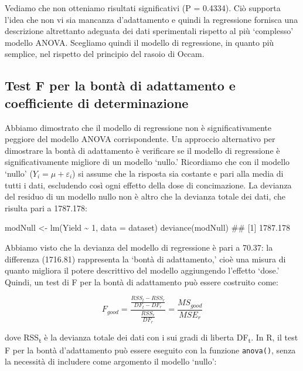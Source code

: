 \documentclass[a4paper,12pt,oneside]{book}
\newenvironment{Shaded}{\begin{snugshade}}{\end{snugshade}}
\newcommand{\DecValTok}[1]{#1}
\newcommand{\SpecialCharTok}[1]{#1}
\newcommand{\DocumentationTok}[1]{#1}
\newcommand{\OtherTok}[1]{#1}
\newcommand{\FunctionTok}[1]{#1}
\newcommand{\AttributeTok}[1]{#1}
\newcommand{\NormalTok}[1]{#1}
\begin{document}
Vediamo che non otteniamo risultati significativi (P = 0.4334). Ciò supporta l'idea che non vi sia mancanza d'adattamento e quindi la regressione fornisca una descrizione altrettanto adeguata dei dati sperimentali rispetto al più `complesso' modello ANOVA. Scegliamo quindi il modello di regressione, in quanto più semplice, nel rispetto del principio del rasoio di Occam.

\hypertarget{test-f-per-la-bontuxe0-di-adattamento-e-coefficiente-di-determinazione}{%
\subsection{Test F per la bontà di adattamento e coefficiente di determinazione}\label{test-f-per-la-bontuxe0-di-adattamento-e-coefficiente-di-determinazione}}

Abbiamo dimostrato che il modello di regressione non è significativamente peggiore del modello ANOVA corrispondente. Un approccio alternativo per dimostrare la bontà di adattamento è verificare se il modello di regressione è significativamente migliore di un modello `nullo.' Ricordiamo che con il modello `nullo' (\(Y_i = \mu + \varepsilon_i\)) si assume che la risposta sia costante e pari alla media di tutti i dati, escludendo così ogni effetto della dose di concimazione. La devianza del residuo di un modello nullo non è altro che la devianza totale dei dati, che risulta pari a 1787.178:

\begin{Shaded}
\begin{Highlighting}[]
\NormalTok{modNull }\OtherTok{\textless{}{-}} \FunctionTok{lm}\NormalTok{(Yield }\SpecialCharTok{\textasciitilde{}} \DecValTok{1}\NormalTok{, }\AttributeTok{data =}\NormalTok{ dataset)}
\FunctionTok{deviance}\NormalTok{(modNull)}
\DocumentationTok{\#\# [1] 1787.178}
\end{Highlighting}
\end{Shaded}

Abbiamo visto che la devianza del modello di regressione è pari a 70.37: la differenza (1716.81) rappresenta la `bontà di adattamento,' cioè una misura di quanto migliora il potere descrittivo del modello aggiungendo l'effetto `dose.' Quindi, un test di F per la bontà di adattamento può essere costruito come:

\[ F_{good} = \frac{\frac{RSS_t - RSS_r}{DF_t - DF_r} } {\frac{RSS_r}{DF_r}} = \frac{MS_{good}}{MSE_r}\]

dove RSS\textsubscript{t} è la devianza totale dei dati con i sui gradi di liberta DF\textsubscript{t}. In R, il test F per la bontà d'adattamento può essere eseguito con la funzione \texttt{anova()}, senza la necessità di includere come argomento il modello `nullo':
\end{document}

